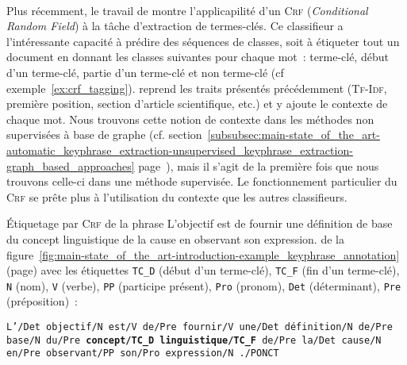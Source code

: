         ~\\Plus récemment, le travail de 
        montre l'applicapilité d'un \textsc{Crf} (\textit{Conditional Random
        Field}) à la tâche d'extraction de termes-clés. Ce classifieur a
        l'intéressante capacité à prédire des séquences de classes, soit à
        étiqueter tout un document en donnant les classes suivantes pour chaque
        mot~: \og{}terme-clé\fg{}, \og{}début d'un terme-clé\fg{}, \og{}partie
        d'un terme-clé\fg{} et \og{}non terme-clé\fg{} (cf
        exemple~\ref{ex:crf_tagging}). 
        reprend les traits présentés précédemment (\textsc{Tf-Idf}, première position,
        section d'article scientifique, etc.) et y ajoute le contexte de
        chaque mot. Nous trouvons cette notion de contexte dans les méthodes non
        supervisées à base de graphe (cf.
        section~\ref{subsubsec:main-state_of_the_art-automatic_keyphrase_extraction-unsupervised_keyphrase_extraction-graph_based_approaches}
        page~\pageref{subsubsec:main-state_of_the_art-automatic_keyphrase_extraction-unsupervised_keyphrase_extraction-graph_based_approaches}),
        mais il s'agit de la première fois que nous trouvons celle-ci dans une
        méthode supervisée. Le fonctionnement particulier du \textsc{Crf} se
        prête plus à l'utilisation du contexte que les autres classifieurs.

        \begin{example}\label{ex:crf_tagging}
          Étiquetage par \textsc{Crf} de la phrase \og{}L'objectif est de
          fournir une définition de base du concept linguistique de la cause en
          observant son expression.\fg{} de la
          figure~\ref{fig:main-state_of_the_art-introduction-example_keyphrase_annotation}
          (page\pageref{fig:main-state_of_the_art-introduction-example_keyphrase_annotation})
          avec les étiquettes \texttt{TC\_D} (début d'un terme-clé),
          \texttt{TC\_F} (fin d'un terme-clé), \texttt{N} (nom), \texttt{V}
          (verbe), \texttt{PP} (participe présent), \texttt{Pro} (pronom),
          \texttt{Det} (déterminant), \texttt{Pre} (préposition)~:\\
          \begin{center}\vspace{-1em}
            \parbox{.8\linewidth}{
              \texttt{L'/Det objectif/N est/V de/Pre fournir/V une/Det
              définition/N de/Pre base/N du/Pre \textbf{concept/TC\_D
              linguistique/TC\_F} de/Pre la/Det cause/N en/Pre observant/PP
              son/Pro expression/N ./PONCT}
            }
          \end{center}\vspace{.25em}
        \end{example}

